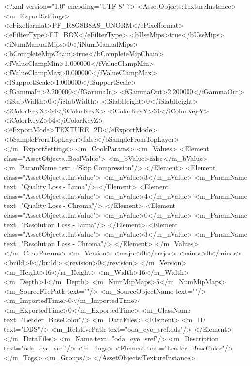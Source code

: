 <?xml version="1.0" encoding="UTF-8" ?>
<AssetObjects:TextureInstance>
<m_ExportSettings>
<ePixelformat>PF_R8G8B8A8_UNORM</ePixelformat>
<eFilterType>FT_BOX</eFilterType>
<bUseMips>true</bUseMips>
<iNumManualMips>0</iNumManualMips>
<bCompleteMipChain>true</bCompleteMipChain>
<fValueClampMin>1.000000</fValueClampMin>
<fValueClampMax>0.000000</fValueClampMax>
<fSupportScale>1.000000</fSupportScale>
<fGammaIn>2.200000</fGammaIn>
<fGammaOut>2.200000</fGammaOut>
<iSlabWidth>0</iSlabWidth>
<iSlabHeight>0</iSlabHeight>
<iColorKeyX>64</iColorKeyX>
<iColorKeyY>64</iColorKeyY>
<iColorKeyZ>64</iColorKeyZ>
<eExportMode>TEXTURE_2D</eExportMode>
<bSampleFromTopLayer>false</bSampleFromTopLayer>
</m_ExportSettings>
<m_CookParams>
<m_Values>
<Element class="AssetObjects..BoolValue">
<m_bValue>false</m_bValue>
<m_ParamName text="Skip Compression"/>
</Element>
<Element class="AssetObjects..IntValue">
<m_nValue>3</m_nValue>
<m_ParamName text="Quality Loss - Luma"/>
</Element>
<Element class="AssetObjects..IntValue">
<m_nValue>4</m_nValue>
<m_ParamName text="Quality Loss - Chroma"/>
</Element>
<Element class="AssetObjects..IntValue">
<m_nValue>0</m_nValue>
<m_ParamName text="Resolution Loss - Luma"/>
</Element>
<Element class="AssetObjects..IntValue">
<m_nValue>3</m_nValue>
<m_ParamName text="Resolution Loss - Chroma"/>
</Element>
</m_Values>
</m_CookParams>
<m_Version>
<major>0</major>
<minor>0</minor>
<build>0</build>
<revision>0</revision>
</m_Version>
<m_Height>16</m_Height>
<m_Width>16</m_Width>
<m_Depth>1</m_Depth>
<m_NumMipMaps>5</m_NumMipMaps>
<m_SourceFilePath text=""/>
<m_SourceObjectName text=""/>
<m_ImportedTime>0</m_ImportedTime>
<m_ExportedTime>0</m_ExportedTime>
<m_ClassName text="Leader_BaseColor"/>
<m_DataFiles>
<Element>
<m_ID text="DDS"/>
<m_RelativePath text="oda_eye_sref.dds"/>
</Element>
</m_DataFiles>
<m_Name text="oda_eye_sref"/>
<m_Description text="oda_eye_sref"/>
<m_Tags>
<Element text="Leader_BaseColor"/>
</m_Tags>
<m_Groups/>
</AssetObjects:TextureInstance>
